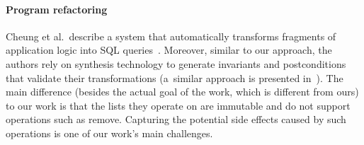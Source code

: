 \documentclass[runningheads,a4paper]{llncs}
\begin{document}
\paragraph{Program refactoring}

Cheung et al.~describe a system that automatically transforms fragments of
application logic into SQL queries~\cite{DBLP:conf/pldi/CheungSM13}. 
Moreover, similar to our approach, the authors rely on synthesis technology
to generate invariants and postconditions that validate their
transformations (a~similar approach is presented
in~\cite{DBLP:conf/cc/IuCZ10}).  The main difference (besides the actual
goal of the work, which is different from ours) to our work is that the
lists they operate on are immutable and do not support operations such as
remove.  Capturing the potential side effects caused by such operations is
one of our work's main challenges.
\end{document}

